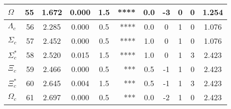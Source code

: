 \documentclass[a4paper,10pt]{article}
\begin{document}
\begin{tabular}{lrcccrccccc}
$\Omega        $ &  55&  1.672&  0.000 &  1.5 &  ****&      0.0&      -3&       0&       0& 1.254\\
\midrule
$\Lambda_c     $ &  56&  2.285&  0.000 &  0.5 &  ****&      0.0&       0&       1&       0& 1.076\\
$\Sigma_c      $ &  57&  2.452&  0.000 &  0.5 &  ****&      1.0&       0&       1&       0& 1.076\\
$\Sigma_c^*    $ &  58&  2.520&  0.015 &  1.5 &  ****&      1.0&       0&       1&       3& 2.423\\
$\Xi_c         $ &  59&  2.466&  0.000 &  0.5 &   ***&      0.5&      -1&       1&       0& 2.423\\
$\Xi_c^*       $ &  60&  2.645&  0.004 &  1.5 &   ***&      0.5&      -1&       1&       3& 2.423\\
$\Omega_c      $ &  61&  2.697&  0.000 &  0.5 &   ***&      0.0&      -2&       1&       0& 2.423\\
\bottomrule
\end{tabular}
\end{document}
